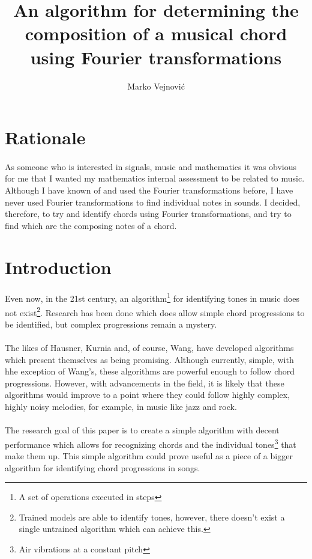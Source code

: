 \documentclass{article}
\title{An algorithm for determining the composition of a musical chord using 
	Fourier transformations}
\author{Marko Vejnovi\'{c}}
\begin{document}
\maketitle

\section{Rationale}
\paragraph*{}
As someone who is interested in signals, music and mathematics it was obvious 
for me that I wanted my mathematics internal assessment to be related to 
music. Although I have known of and used the Fourier transformations before, I 
have never used Fourier transformations to find individual notes in sounds. I 
decided, therefore, to try and identify chords using Fourier transformations, 
and try to find which are the composing notes of a chord.

\section{Introduction}

\paragraph*{}
Even now, in the 21st century, an algorithm\footnote{A set of operations
executed in steps} for identifying tones in music does not
exist\footnote{Trained models are able to identify tones, however, there
doesn't exist a single untrained algorithm which can achieve this.}.  Research
has been done which does allow simple chord progressions to be identified, but
complex progressions remain a mystery.

\paragraph*{}
The likes of Hausner, Kurnia and, of course, Wang, have developed algorithms 
which present themselves as being promising. Although currently, simple, with 
hhe exception of Wang's, these algorithms are powerful enough to follow chord 
progressions. However, with advancements in the field, it is likely that these 
algorithms would improve to a point where they could follow highly complex, 
highly noisy melodies, for example, in music like jazz and rock.

\paragraph*{}
The research goal of this paper is to create a simple algorithm with decent
performance which allows for recognizing chords and the individual
tones\footnote{Air vibrations at a constant pitch} that make them up. This
simple algorithm could prove useful as a piece of a bigger algorithm for
identifying chord progressions in songs.
\end{document}
